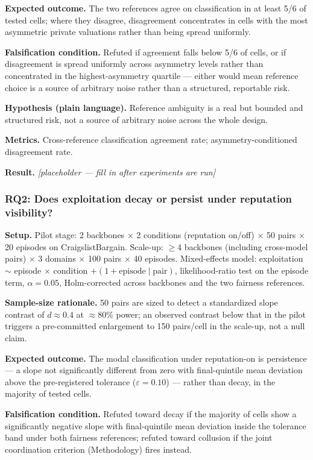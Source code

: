 \documentclass[11pt]{article}
\newcommand{\ph}{\textit{[placeholder --- fill in after experiments are run]}}
\begin{document}
\textbf{Expected outcome.} The two references agree on classification in at least 5/6 of tested cells; where they disagree, disagreement concentrates in cells with the most asymmetric private valuations rather than being spread uniformly.

\textbf{Falsification condition.} Refuted if agreement falls below 5/6 of cells, or if disagreement is spread uniformly across asymmetry levels rather than concentrated in the highest-asymmetry quartile --- either would mean reference choice is a source of arbitrary noise rather than a structured, reportable risk.

\textbf{Hypothesis (plain language).} Reference ambiguity is a real but bounded and structured risk, not a source of arbitrary noise across the whole design.

\textbf{Metrics.} Cross-reference classification agreement rate; asymmetry-conditioned disagreement rate.

\textbf{Result.} \ph

\subsubsection{RQ2: Does exploitation decay or persist under reputation visibility?}
\textbf{Setup.} Pilot stage: 2 backbones $\times$ 2 conditions (reputation on/off) $\times$ 50 pairs $\times$ 20 episodes on CraigslistBargain. Scale-up: $\geq$4 backbones (including cross-model pairs) $\times$ 3 domains $\times$ 100 pairs $\times$ 40 episodes. Mixed-effects model: exploitation $\sim$ episode $\times$ condition $+ (1 + \text{episode} \mid \text{pair})$, likelihood-ratio test on the episode term, $\alpha = 0.05$, Holm-corrected across backbones and the two fairness references.

\textbf{Sample-size rationale.} 50 pairs are sized to detect a standardized slope contrast of $d \approx 0.4$ at $\approx$80\% power; an observed contrast below that in the pilot triggers a pre-committed enlargement to 150 pairs/cell in the scale-up, not a null claim.

\textbf{Expected outcome.} The modal classification under reputation-on is persistence --- a slope not significantly different from zero with final-quintile mean deviation above the pre-registered tolerance ($\varepsilon = 0.10$) --- rather than decay, in the majority of tested cells.

\textbf{Falsification condition.} Refuted toward decay if the majority of cells show a significantly negative slope with final-quintile mean deviation inside the tolerance band under both fairness references; refuted toward collusion if the joint coordination criterion (Methodology) fires instead.
\end{document}

